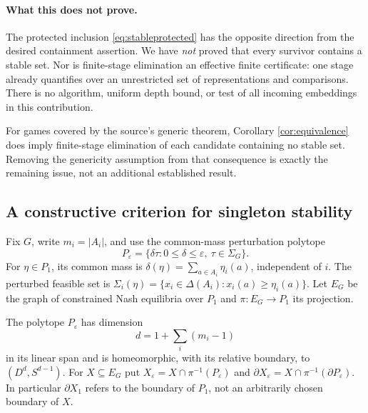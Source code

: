 \documentclass[11pt]{article}
\theoremstyle{definition}
\begin{document}
\paragraph{What this does not prove.}
The protected inclusion \eqref{eq:stableprotected} has the opposite direction
from the desired containment assertion. We have \emph{not} proved that every
survivor contains a stable set. Nor is finite-stage elimination an effective
finite certificate: one stage already quantifies over an unrestricted set of
representations and comparisons. There is no algorithm, uniform depth bound,
or test of all incoming embeddings in this contribution.

For games covered by the source's generic theorem, Corollary
\ref{cor:equivalence} does imply finite-stage elimination of each candidate
containing no stable set. Removing the genericity assumption from that
consequence is exactly the remaining issue, not an additional established
result.

\subsection{A constructive criterion for singleton stability}\label{sec:section}
Fix $G$, write $m_i=|A_i|$, and use the common-mass perturbation polytope
\[
 P_\varepsilon=\{\delta\tau:0\le\delta\le\varepsilon,\ \tau\in\Sigma_G\}.
\]
For $\eta\in P_1$, its common mass is
$\delta(\eta)=\sum_{a\in A_i}\eta_i(a)$, independent of $i$.
The perturbed feasible set is
$\Sigma_i(\eta)=\{x_i\in\Delta(A_i):x_i(a)\ge\eta_i(a)\}$.
Let $E_G$ be the graph of constrained Nash equilibria over $P_1$ and
$\pi:E_G\to P_1$ its projection.

The polytope $P_\varepsilon$ has dimension
\[
 d=1+\sum_i(m_i-1)
\]
in its linear span and is homeomorphic, with its relative boundary, to
$(D^d,S^{d-1})$. For $X\subseteq E_G$ put
$X_\varepsilon=X\cap\pi^{-1}(P_\varepsilon)$ and
$\partial X_\varepsilon=X\cap\pi^{-1}(\partial P_\varepsilon)$.
In particular $\partial X_1$ refers to the boundary of $P_1$, not an
arbitrarily chosen boundary of $X$.
\end{document}
